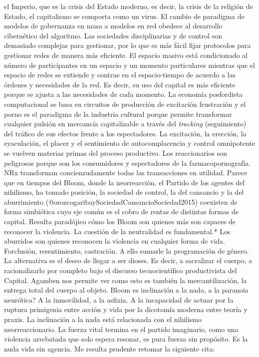 \documentclass[
]{article}
\begin{document}
el Imperio, que es la crisis del Estado moderno, es decir, la crisis de
la religión de Estado, el capitalismo se comporta como un virus. El
cambio de paradigma de modelos de gobernanza en masa a modelos en red
obedece al desarrollo cibernético del algoritmo. Las sociedades
disciplinarias y de control son demasiado complejas para gestionar, por
lo que es más fácil fijar protocolos para gestionar redes de manera más
eficiente. El espacio masivo está condicionado al número de
participantes en un espacio y un momento particulares mientras que el
espacio de redes se extiende y contrae en el espacio-tiempo de acuerdo a
las órdenes y necesidades de la red. Es decir, su uso del capital es más
eficiente porque se ajusta a las necesidades de cada momento. La
economía posfordista computacional se basa en circuitos de producción de
excitación frustración y el porno es el paradigma de la industria
cultural porque permite transformar cualquier pulsión en mercancía
capitalizable a través del \emph{tracking} (seguimiento) del tráfico de
sus efectos frente a los espectadores. La excitación, la erección, la
eyaculación, el placer y el sentimiento de autocomplacencia y control
omnipotente se vuelven materias primas del proceso productivo. Los
reaccionarios son peligrosos porque son los consumidores y espectadores
de la farmacopornografía. NRx transforman concienzudamente todas las
transacciones en utilidad. Parece que en tiempos del Bloom, donde la
neorreacción, el Partido de los agentes del nihilismo, ha tomado
posición, la sociedad de control, la del cansancio y la del aburrimiento
(@orozcogaribaySociedadCansancioSociedad2015) coexisten de forma
simbiótica cuyo eje común es el cobro de rentas de distintas formas de
capital. Resulta paradójico cómo los Bloom son quienes más son capaces
de reconocer la violencia. La cuestión de la neutralidad es
fundamental.* Los aburridos son quienes reconocen la violencia en
cualquier forma de vida. Forclusión, resentimiento, castración. A ello
sumarle la programación de género. La alternativa es el deseo de llegar
a ser dioses. Es decir, a sacralizar el cuerpo, a racionalizarlo por
completo bajo el discurso tecnocientífico productivista del Capital.
Agamben nos permite ver como esto es también la mercantilización, la
entrega total del cuerpo al objeto. Bloom es inclinación a la nada, a la
paranoia neurótica? A la inmovilidad, a la asfixia. A la incapacidad de
actuar por la ruptura primigenia entre acción y vida por la dicotomía
moderna entre teoría y praxis. La inclinación a la nada está relacionada
con el nihilismo neorreaccionario. La fuerza vital termina en el partido
imaginario, como una violencia arrebatada que solo espera resonar, es
pura fuerza sin propósito. Es la nuda vida sin agencia. Me resulta
prudente retomar la siguiente cita:
\end{document}
